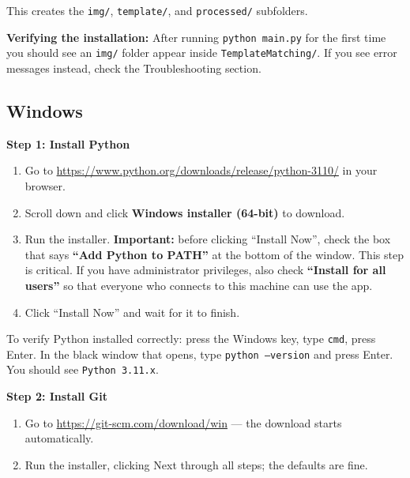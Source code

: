 \documentclass[11pt, letterpaper]{article}
\begin{document}
This creates the \texttt{img/}, \texttt{template/}, and \texttt{processed/} subfolders.

\begin{tipbox}
\textbf{Verifying the installation:} After running \texttt{python main.py} for the first time
you should see an \texttt{img/} folder appear inside \texttt{TemplateMatching/}. If you see
error messages instead, check the Troubleshooting section.
\end{tipbox}

\subsection*{Windows}

\textbf{Step 1: Install Python}

\begin{enumerate}
  \item Go to \url{https://www.python.org/downloads/release/python-3110/} in your browser.
  \item Scroll down and click \textbf{Windows installer (64-bit)} to download.
  \item Run the installer. \textbf{Important:} before clicking ``Install Now'', check the
        box that says \textbf{``Add Python to PATH''} at the bottom of the window. This
        step is critical. If you have administrator privileges, also check
        \textbf{``Install for all users''} so that everyone who connects to this machine
        can use the app.
  \item Click ``Install Now'' and wait for it to finish.
\end{enumerate}

\begin{tipbox}
To verify Python installed correctly: press the Windows key, type \texttt{cmd}, press
Enter. In the black window that opens, type \texttt{python --version} and press Enter.
You should see \texttt{Python 3.11.x}.
\end{tipbox}

\textbf{Step 2: Install Git}

\begin{enumerate}
  \item Go to \url{https://git-scm.com/download/win} --- the download starts automatically.
  \item Run the installer, clicking Next through all steps; the defaults are fine.
\end{enumerate}
\end{document}
